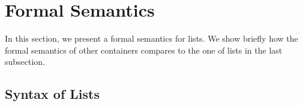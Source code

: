 \documentclass[runningheads,a4paper]{llncs}
\newcommand{\beforesec}{\vspace{-0.2cm}}
\newcommand{\aftersec}{\vspace{-0.2cm}}
\newcommand{\beforesub}{\vspace{-0.2cm}}
\newcommand{\aftersub}{\vspace{-0.1cm}}
\begin{document}




\beforesec
\section{Formal Semantics}
\label{sec:description}
\aftersec

In this section, we present a formal semantics for lists. We show
briefly how the formal semantics of other containers compares to the one of
lists in the last subsection.

\beforesub
\subsection{Syntax of Lists}
\aftersub
\end{document}
